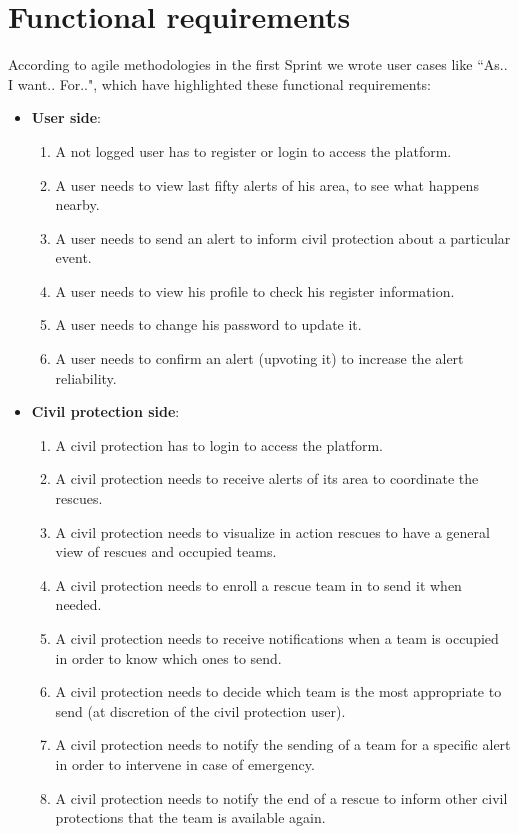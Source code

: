 \documentclass[a4paper,12pt]{report}
\begin{document}
\section{Functional requirements}

According to agile methodologies in the first Sprint we wrote user cases like ``As.. I want.. For..", which have highlighted these functional requirements:

\begin{itemize}
\item \textbf{User side}:
\begin{enumerate}
\item A not logged user has to register or login to access the platform.
\item A user needs to view last fifty alerts of his area, to see what happens nearby.
\item A user needs to send an alert to inform civil protection about a particular event.
\item A user needs to view his profile to check his register information.
\item A user needs to change his password to update it.
\item A user needs to confirm an alert (upvoting it) to increase the alert reliability.
\end{enumerate}
\end{itemize}

\begin{itemize}
\item \textbf{Civil protection side}:
\begin{enumerate}
\item A civil protection has to login to access the platform.
\item A civil protection needs to receive alerts of its area to coordinate the rescues.
\item A civil protection needs to visualize in action rescues to have a general view of rescues and occupied teams.
\item A civil protection needs to enroll a rescue team in to send it when needed.
\item A civil protection needs to receive notifications when a team is occupied in order to know which ones to send.
\item A civil protection needs to decide which team is the most appropriate to send (at discretion of the civil protection user).
\item A civil protection needs to notify the sending of a team for a specific alert in order to intervene in case of emergency.
\item A civil protection needs to notify the end of a rescue to inform other civil protections that the team is available again.
\end{enumerate}
\end{itemize}
\end{document}
